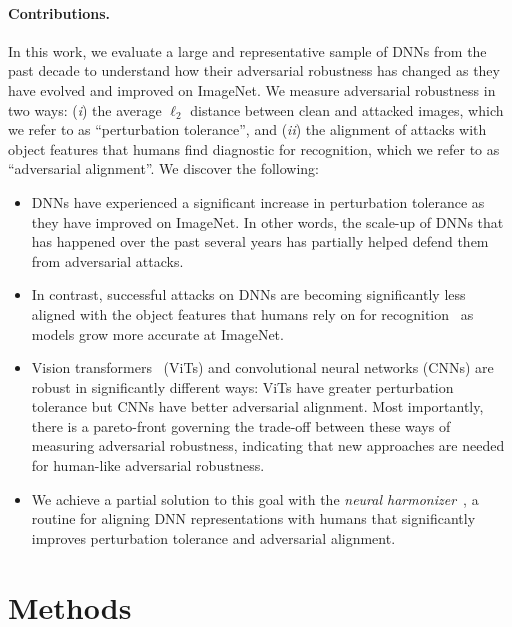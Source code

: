 \documentclass{article}
\theoremstyle{plain}
\theoremstyle{definition}
\theoremstyle{remark}
\begin{document}
\paragraph{Contributions.} 
In this work, we evaluate a large and representative sample of DNNs from the past decade to understand how their adversarial robustness has changed as they have evolved and improved on ImageNet.  We measure adversarial robustness in two ways: (\textit{i}) the average $\ell_{2}$ distance between clean and attacked images, which we refer to as ``perturbation tolerance'', and (\textit{ii}) the alignment of attacks with object features that humans find diagnostic for recognition, which we refer to as ``adversarial alignment''. We discover the following:
\begin{itemize}[leftmargin=*]\vspace{-2mm}
    \item DNNs have experienced a significant increase in perturbation tolerance as they have improved on ImageNet. In other words, the scale-up of DNNs that has happened over the past several years has partially helped defend them from adversarial attacks.
    \item In contrast, successful attacks on DNNs are becoming significantly less aligned with the object features that humans rely on for recognition~\cite{Linsley2020-en,Fel2022-dt} as models grow more accurate at ImageNet.
    \item Vision transformers~\cite{Dehghani2023-zw,Dosovitskiy2021-zy} (ViTs) and convolutional neural networks (CNNs) are robust in significantly different ways: ViTs have greater perturbation tolerance but CNNs have better adversarial alignment. Most importantly, there is a pareto-front governing the trade-off between these ways of measuring adversarial robustness, indicating that new approaches are needed for human-like adversarial robustness.
    \item We achieve a partial solution to this goal with the \emph{neural harmonizer}~\cite{Fel2022-dt}, a routine for aligning DNN representations with humans that significantly improves perturbation tolerance and adversarial alignment. 
\end{itemize}

\section{Methods}
\end{document}
